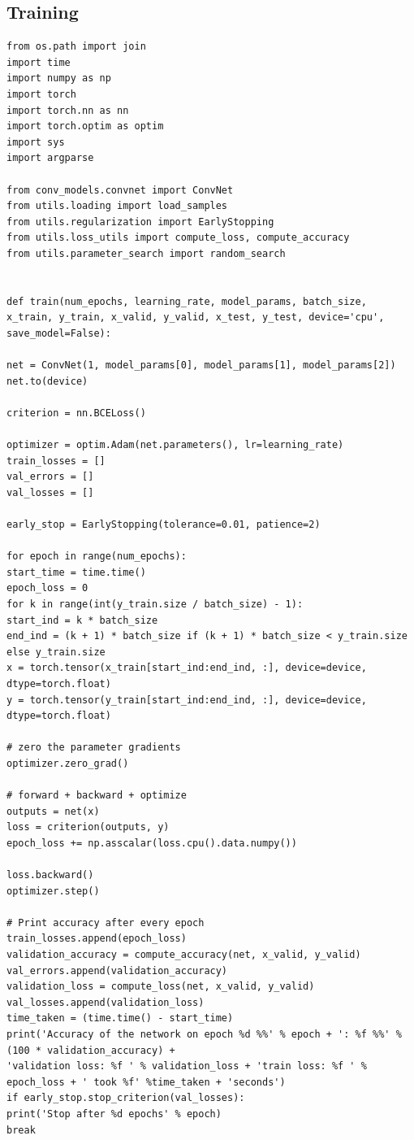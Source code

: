 \documentclass[aps,prb,10pt,twocolumn,groupedaddress]{revtex4-1}
\begin{document}
\subsection{Training}
\begin{lstlisting}
from os.path import join
import time
import numpy as np
import torch
import torch.nn as nn
import torch.optim as optim
import sys
import argparse

from conv_models.convnet import ConvNet
from utils.loading import load_samples
from utils.regularization import EarlyStopping
from utils.loss_utils import compute_loss, compute_accuracy
from utils.parameter_search import random_search


def train(num_epochs, learning_rate, model_params, batch_size, x_train, y_train, x_valid, y_valid, x_test, y_test, device='cpu', save_model=False):

net = ConvNet(1, model_params[0], model_params[1], model_params[2])
net.to(device)

criterion = nn.BCELoss()

optimizer = optim.Adam(net.parameters(), lr=learning_rate)
train_losses = []
val_errors = []
val_losses = []

early_stop = EarlyStopping(tolerance=0.01, patience=2)

for epoch in range(num_epochs):
start_time = time.time()
epoch_loss = 0
for k in range(int(y_train.size / batch_size) - 1):
start_ind = k * batch_size
end_ind = (k + 1) * batch_size if (k + 1) * batch_size < y_train.size else y_train.size
x = torch.tensor(x_train[start_ind:end_ind, :], device=device, dtype=torch.float)
y = torch.tensor(y_train[start_ind:end_ind, :], device=device, dtype=torch.float)

# zero the parameter gradients
optimizer.zero_grad()

# forward + backward + optimize
outputs = net(x)
loss = criterion(outputs, y)
epoch_loss += np.asscalar(loss.cpu().data.numpy())

loss.backward()
optimizer.step()

# Print accuracy after every epoch
train_losses.append(epoch_loss)
validation_accuracy = compute_accuracy(net, x_valid, y_valid)
val_errors.append(validation_accuracy)
validation_loss = compute_loss(net, x_valid, y_valid)
val_losses.append(validation_loss)
time_taken = (time.time() - start_time)
print('Accuracy of the network on epoch %d %%' % epoch + ': %f %%' % (100 * validation_accuracy) +
'validation loss: %f ' % validation_loss + 'train loss: %f ' % epoch_loss + ' took %f' %time_taken + 'seconds')
if early_stop.stop_criterion(val_losses):
print('Stop after %d epochs' % epoch)
break


\end{lstlisting}
\end{document}
